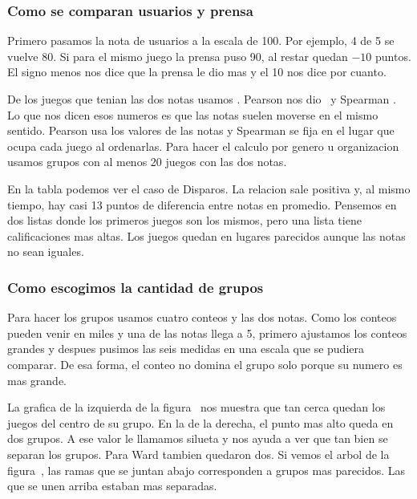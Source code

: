 
\subsubsection{Como se comparan usuarios y prensa}
Primero pasamos la nota de usuarios a la escala de 100. Por ejemplo, 4 de 5 se vuelve 80. Si para el mismo juego la prensa puso 90, al restar quedan $-10$ puntos. El signo menos nos dice que la prensa le dio mas y el 10 nos dice por cuanto.

De los juegos que tenian las dos notas usamos \Pares. Pearson nos dio \PearsonGlobal\ y Spearman \SpearmanGlobal. Lo que nos dicen esos numeros es que las notas suelen moverse en el mismo sentido. Pearson usa los valores de las notas y Spearman se fija en el lugar que ocupa cada juego al ordenarlas. Para hacer el calculo por genero u organizacion usamos grupos con al menos 20 juegos con las dos notas.

\AsociacionGrupos

En la tabla podemos ver el caso de Disparos. La relacion sale positiva y, al mismo tiempo, hay casi 13 puntos de diferencia entre notas en promedio. Pensemos en dos listas donde los primeros juegos son los mismos, pero una lista tiene calificaciones mas altas. Los juegos quedan en lugares parecidos aunque las notas no sean iguales.

\subsubsection{Como escogimos la cantidad de grupos}
Para hacer los grupos usamos cuatro conteos y las dos notas. Como los conteos pueden venir en miles y una de las notas llega a 5, primero ajustamos los conteos grandes y despues pusimos las seis medidas en una escala que se pudiera comparar. De esa forma, el conteo no domina el grupo solo porque su numero es mas grande.

La grafica de la izquierda de la figura~ nos muestra que tan cerca quedan los juegos del centro de su grupo. En la de la derecha, el punto mas alto queda en dos grupos. A ese valor le llamamos silueta y nos ayuda a ver que tan bien se separan los grupos. Para Ward tambien quedaron dos. Si vemos el arbol de la figura~, las ramas que se juntan abajo corresponden a grupos mas parecidos. Las que se unen arriba estaban mas separadas.

